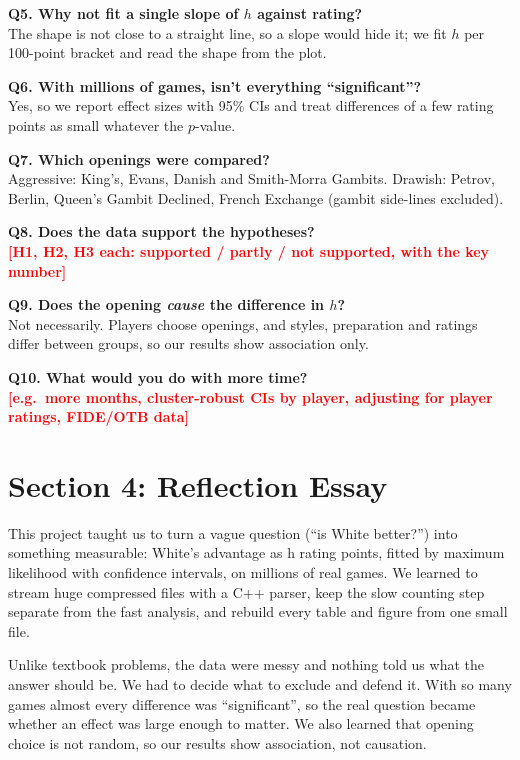 \documentclass[11pt,a4paper]{article}
\newcommand{\TBD}[1]{\textcolor{red}{\textbf{[#1]}}}
\begin{document}
\textbf{Q5. Why not fit a single slope of $h$ against rating?}\\
The shape is not close to a straight line, so a slope would hide it; we fit $h$ per
100-point bracket and read the shape from the plot.

\textbf{Q6. With millions of games, isn't everything ``significant''?}\\
Yes, so we report effect sizes with 95\% CIs and treat differences of a few rating points as
small whatever the $p$-value.

\textbf{Q7. Which openings were compared?}\\
Aggressive: King's, Evans, Danish and Smith-Morra Gambits. Drawish: Petrov, Berlin, Queen's
Gambit Declined, French Exchange (gambit side-lines excluded).

\textbf{Q8. Does the data support the hypotheses?}\\
\TBD{H1, H2, H3 each: supported / partly / not supported, with the key number}

\textbf{Q9. Does the opening \emph{cause} the difference in $h$?}\\
Not necessarily. Players choose openings, and styles, preparation and ratings differ between
groups, so our results show association only.

\textbf{Q10. What would you do with more time?}\\
\TBD{e.g.\ more months, cluster-robust CIs by player, adjusting for player ratings, FIDE/OTB data}

\newpage

\section*{Section 4: Reflection Essay}

This project taught us to turn a vague question (“is White better?”) into something measurable: White’s advantage as h rating points, fitted by maximum likelihood with confidence intervals, on millions of real games. We learned to stream huge compressed files with a C++ parser, keep the slow counting step separate from the fast analysis, and rebuild every table and figure from one small file.

Unlike textbook problems, the data were messy and nothing told us what the answer should be. We had to decide what to exclude and defend it. With so many games almost every difference was “significant”, so the real question became whether an effect was large enough to matter. We also learned that opening choice is not random, so our results show association, not causation.
\end{document}
